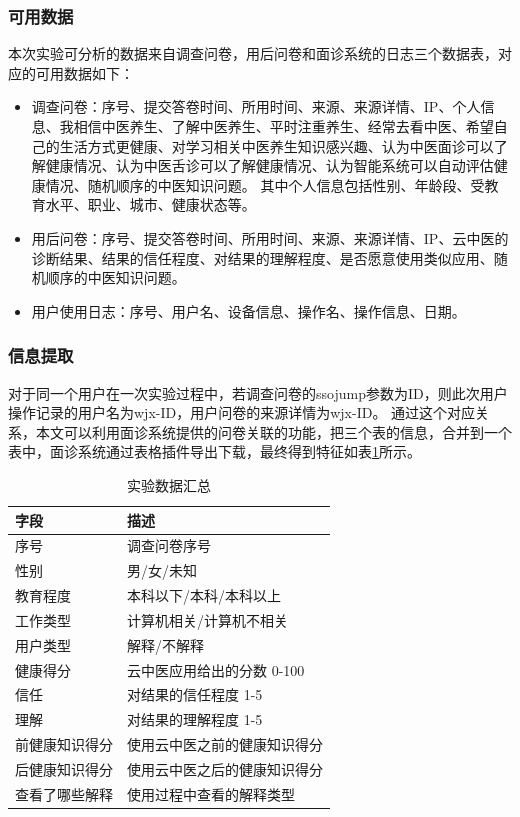 \subsubsection{可用数据}
本次实验可分析的数据来自调查问卷，用后问卷和面诊系统的日志三个数据表，对应的可用数据如下：
\begin{itemize}
    \item 调查问卷：序号、提交答卷时间、所用时间、来源、来源详情、IP、个人信息、我相信中医养生、了解中医养生、平时注重养生、经常去看中医、希望自己的生活方式更健康、对学习相关中医养生知识感兴趣、认为中医面诊可以了解健康情况、认为中医舌诊可以了解健康情况、认为智能系统可以自动评估健康情况、随机顺序的中医知识问题。
    其中个人信息包括性别、年龄段、受教育水平、职业、城市、健康状态等。
    \item 用后问卷：序号、提交答卷时间、所用时间、来源、来源详情、IP、云中医的诊断结果、结果的信任程度、对结果的理解程度、是否愿意使用类似应用、随机顺序的中医知识问题。
    \item 用户使用日志：序号、用户名、设备信息、操作名、操作信息、日期。
\end{itemize}


\subsubsection{信息提取}
对于同一个用户在一次实验过程中，若调查问卷的ssojump参数为ID，则此次用户操作记录的用户名为wjx-ID，用户问卷的来源详情为wjx-ID。 
通过这个对应关系，本文可以利用面诊系统提供的问卷关联的功能，把三个表的信息，合并到一个表中，面诊系统通过表格插件导出下载，最终得到特征如表\ref{tab:exp_data}所示。


\begin{table}[h]
    \centering
    \caption{实验数据汇总}
    \begin{tabular}{ll}
        \toprule
        字段 & 描述 \\ 
        \midrule
        序号 & 调查问卷序号 \\
        性别 & 男/女/未知 \\
        教育程度 & 本科以下/本科/本科以上 \\
        工作类型 & 计算机相关/计算机不相关 \\
        用户类型 & 解释/不解释 \\
        健康得分 & 云中医应用给出的分数 0-100 \\
        信任 & 对结果的信任程度 1-5 \\
        理解 & 对结果的理解程度 1-5 \\
        前健康知识得分 & 使用云中医之前的健康知识得分 \\
        后健康知识得分 & 使用云中医之后的健康知识得分 \\
        查看了哪些解释 & 使用过程中查看的解释类型 \\
        \bottomrule
    \end{tabular}
    \label{tab:exp_data}
\end{table}

